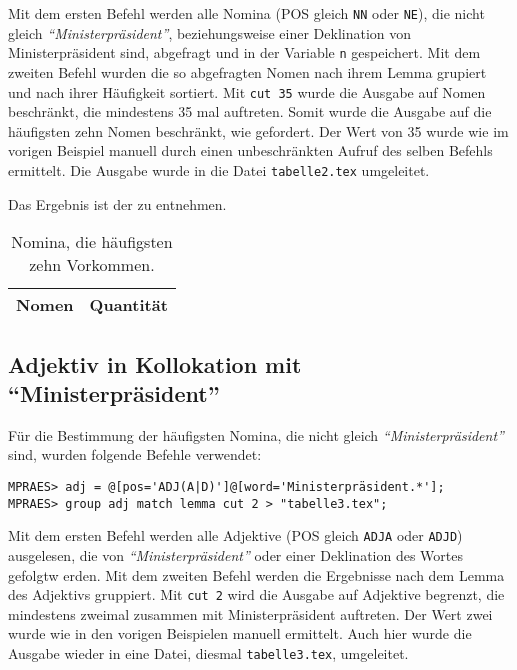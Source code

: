 \documentclass[%
	type=document,%
  	style=article,%
  	media=print,
  	pages=oneside,%
  	prefixLecturer=Dozenten:,
  	author=multiple,
]{unihildesheim} %
\begin{document}
Mit dem ersten Befehl werden alle Nomina (POS gleich \texttt{NN} oder
\texttt{NE}), die nicht gleich \textit{"`Ministerpräsident"'}, beziehungsweise einer
Deklination von Ministerpräsident sind, abgefragt und in der Variable \texttt{n}
gespeichert. Mit dem zweiten Befehl wurden die so abgefragten Nomen nach ihrem Lemma grupiert und
nach ihrer Häufigkeit sortiert. Mit \texttt{cut 35} wurde die Ausgabe auf Nomen
beschränkt, die mindestens 35 mal auftreten. Somit wurde die Ausgabe auf die
häufigsten zehn Nomen beschränkt, wie gefordert. Der Wert von 35 wurde wie im
vorigen Beispiel manuell durch einen unbeschränkten Aufruf des selben
Befehls ermittelt. Die Ausgabe wurde in die Datei \texttt{tabelle2.tex}
umgeleitet.

Das Ergebnis ist der  zu entnehmen.
\begin{table}[htpb]\label{t}
	\center
	\begin{tabularx}{0.35\textwidth}{lr}
		\toprule
		\textbf{Nomen} & \textbf{Quantität}\\
		\midrule
		
		\bottomrule
	\end{tabularx}
	\caption{Nomina, die häufigsten zehn Vorkommen.}
	\label{tab:nomina}
\end{table}

\subsection{Adjektiv in Kollokation mit "`Ministerpräsident"'}
Für die Bestimmung der häufigsten Nomina, die nicht gleich
\textit{"`Ministerpräsident"'} sind, wurden folgende Befehle verwendet:
\begin{Verbatim}[frame=single,label=CQP,commandchars=\\\{\}]
MPRAES> adj = @[pos='ADJ(A|D)']@[word='Ministerpräsident.*'];
MPRAES> group adj match lemma cut 2 > "tabelle3.tex";
\end{Verbatim}
Mit dem ersten Befehl werden alle Adjektive (POS gleich \texttt{ADJA} oder
\texttt{ADJD}) ausgelesen, die von \textit{"`Ministerpräsident"'} oder einer
Deklination des Wortes gefolgtw erden. Mit dem zweiten Befehl werden die Ergebnisse nach dem Lemma des
Adjektivs gruppiert. Mit \texttt{cut 2} wird die Ausgabe auf Adjektive begrenzt,
die mindestens zweimal zusammen mit Ministerpräsident auftreten. Der Wert zwei
wurde wie in den vorigen Beispielen manuell ermittelt. Auch hier wurde die Ausgabe
wieder in eine Datei, diesmal \texttt{tabelle3.tex}, umgeleitet. 
\end{document}
